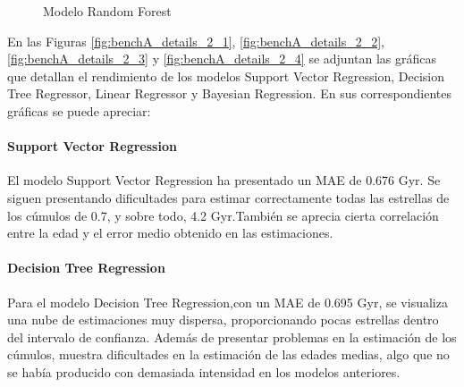 \begin{figure}[h]
\begin{minipage}{.35\linewidth}
\end{minipage}%
\begin{minipage}{.35\linewidth}
\centering
{}
\end{minipage}
\caption{Modelo Random Forest}
\label{fig:benchA_details_1_4}
\end{figure}

En las Figuras \ref{fig:benchA_details_2_1}, \ref{fig:benchA_details_2_2}, \ref{fig:benchA_details_2_3} y \ref{fig:benchA_details_2_4} se adjuntan las gráficas que detallan el rendimiento de los modelos Support Vector Regression, Decision Tree Regressor, Linear Regressor y Bayesian Regression. En sus correspondientes gráficas se puede apreciar:

\paragraph{Support Vector Regression} 
El modelo Support Vector Regression ha presentado un MAE de 0.676 Gyr. Se siguen presentando dificultades para estimar correctamente todas las estrellas de los cúmulos de 0.7, y sobre todo, 4.2 Gyr.También se aprecia cierta correlación entre la edad y el error medio obtenido en las estimaciones. 

\paragraph{Decision Tree Regression} 
Para el modelo Decision Tree Regression,con un MAE de 0.695 Gyr, se visualiza una nube de estimaciones muy dispersa, proporcionando pocas estrellas dentro del intervalo de confianza. Además de presentar problemas en la estimación de los cúmulos, muestra dificultades en la estimación de las edades medias, algo que no se había producido con demasiada intensidad en los modelos anteriores.

